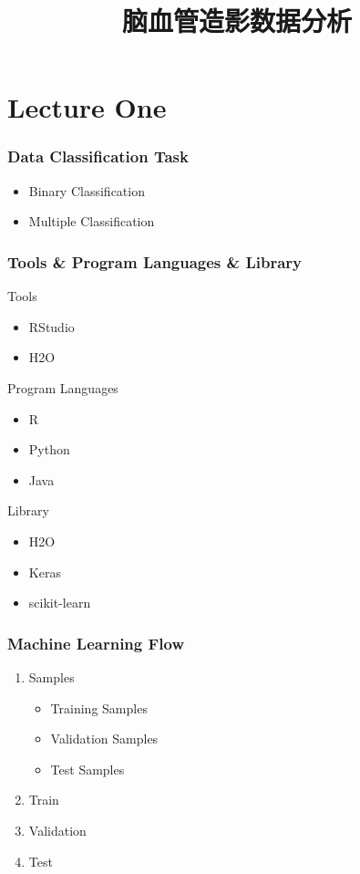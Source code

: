 \documentclass[UTF8,aspectratio=1610,10pt]{ctexbeamer}
\begin{document}
\title[Data Analysis]{脑血管造影数据分析}
\author[ ]{ }
\frame{\titlepage}

\section{Lecture One}
\begin{frame}
\frametitle{Data Classification Task}
\begin{itemize}
  \item Binary Classification
  \item Multiple Classification
\end{itemize}
\end{frame}

\begin{frame}
	\frametitle{Tools \& Program Languages \& Library}
	\begin{block}{Tools}
\begin{itemize}
  \item RStudio
  \item H2O
\end{itemize}		
	\end{block}

\begin{block}{Program Languages}

\begin{itemize}
  \item R
  \item Python
  \item Java
\end{itemize}
\end{block}

\begin{block}{Library}
\begin{itemize}
  \item H2O
  \item Keras
  \item scikit-learn
\end{itemize}
	
\end{block}

\end{frame}

\begin{frame}
\frametitle{Machine Learning Flow}
\begin{enumerate}
  \item Samples
  \begin{itemize}
  \item Training Samples
  \item Validation Samples
  \item Test Samples
\end{itemize}

  \item Train
  \item Validation
  \item Test
\end{enumerate}

\end{frame}
\end{document}
